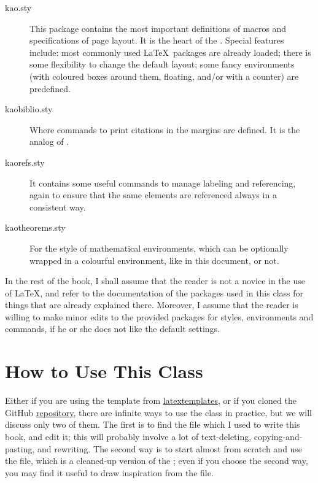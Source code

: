 \begin{description}
	\item[kao.sty] This package contains the most important definitions
    of macros and specifications of page layout. It is the heart of the
    . Special features include: most commonly used
    \LaTeX\ packages are already loaded; there is some flexibility to
    change the default layout; some fancy environments (with coloured
    boxes around them, floating, and/or with a counter) are predefined.
    \item[kaobiblio.sty] Where commands to print citations in the
    margins are defined. It is the
     analog of .
    \item[kaorefs.sty] It contains some useful commands to manage
    labeling and referencing, again to ensure that the same elements are
    referenced always in a consistent way.
    \item[kaotheorems.sty] For the style of mathematical environments,
    which can be optionally wrapped in a colourful 
    environment, like in this document, or not.
    \end{description}


In the rest of the book, I shall assume that the reader is not a novice
in the use of \LaTeX, and refer to the documentation of the packages
used in this class for things that are already explained there.
Moreover, I assume that the reader is willing to make minor edits to the
provided packages for styles, environments and commands, if he or she
does not like the default settings.

\section{How to Use This Class}

Either if you are using the template from
\href{http://latextemplates.org/template/kaobook}{latextemplates}, or if
you cloned the GitHub
\href{https://www.github.com/fmarotta/kaobook}{repository}, there are
infinite ways to use the  class in practice, but we will
discuss only two of them. The first is to find the  file
which I used to write this book, and edit it; this will probably involve
a lot of text-deleting, copying-and-pasting, and rewriting. The second
way is to start almost from scratch and use the
 file, which is a cleaned-up
version of the ; even if you
choose the second way, you may find it useful to draw inspiration from
the  file.

